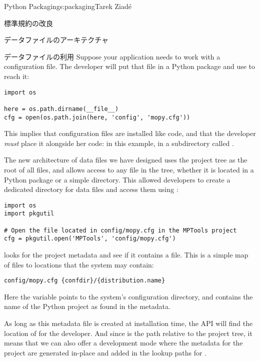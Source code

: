 \begin{aosachapter}{Python Packaging}{s:packaging}{Tarek Ziad\'{e}}
\begin{aosasect1}{標準規約の改良}
\begin{aosasect2}{データファイルのアーキテクチャ}
\begin{aosasect3}{データファイルの利用}
Suppose your  application needs to work with a
configuration file.  The developer will put that file in a Python
package and use  to reach it:

\begin{verbatim}
import os

here = os.path.dirname(__file__)
cfg = open(os.path.join(here, 'config', 'mopy.cfg'))
\end{verbatim}

\noindent This implies that configuration files are installed like code, and
that the developer \emph{must} place it alongside her code: in this
example, in a subdirectory called .

The new architecture of data files we have designed
uses the project tree as the root
of all files, and allows access to any file in the tree, whether it is
located in a Python package or a simple directory.  This allowed
developers to create a dedicated directory for data files and access
them using :

\begin{verbatim}
import os
import pkgutil

# Open the file located in config/mopy.cfg in the MPTools project
cfg = pkgutil.open('MPTools', 'config/mopy.cfg')
\end{verbatim}

\noindent {} looks for the project metadata and see if it
contains a  file. This is a simple map of files to
locations that the system may contain:

\begin{verbatim}
config/mopy.cfg {confdir}/{distribution.name}
\end{verbatim}

\noindent Here the  variable points to the
system's configuration directory, and 
contains the name of the Python project as found in the metadata.


As long as this  metadata file is created at
installation time, the API will find the location of 
for the developer.  And since  is the path
relative to the project tree, it means that we can also offer a
development mode where the metadata for the project are generated
in-place and added in the lookup paths for .


\end{aosasect3}
\end{aosasect2}
\end{aosasect1}
\end{aosachapter}

